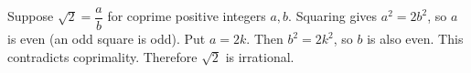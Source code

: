 Suppose $\sqrt 2=\dfrac{a}{b}$ for coprime positive integers $a,b$. Squaring gives $a^2=2b^2$, so $a$ is even (an odd square is odd). Put $a=2k$. Then $b^2=2k^2$, so $b$ is also even. This contradicts coprimality. Therefore $\sqrt 2$ is irrational.
